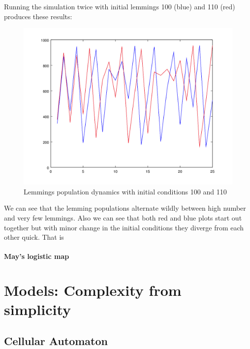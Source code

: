 \documentclass[pdftex, 12pt, a4paper]{report}
\begin{document}
			Running the simulation twice with initial lemmings 100 (blue) and 110 (red) produces these results:\newline
	\begin{figure}[H]

		\centering
		\includegraphics[scale=0.6]{lemmings.png}
		\caption{Lemmings population dynamics with initial conditions 100 and 110}
	\end{figure}
	
	We can see that the lemming populations alternate wildly between high number and very few lemmings. Also we can see that both red and blue plots start out together but with minor change in the initial conditions they diverge from each other quick. That is 
	
	
	
	\subsubsection{May's logistic map}
	
	\chapter{Models: Complexity from simplicity}
	
	\section{Cellular Automaton}
	
\end{document}
